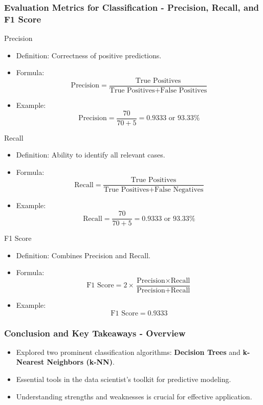\documentclass[aspectratio=169]{beamer}
\begin{document}
\begin{frame}[fragile]
    \frametitle{Evaluation Metrics for Classification - Precision, Recall, and F1 Score}
    
    \begin{block}{Precision}
        \begin{itemize}
            \item Definition: Correctness of positive predictions.
            \item Formula:
            \[
            \text{Precision} = \frac{\text{True Positives}}{\text{True Positives} + \text{False Positives}}
            \]
            \item Example: 
            \[
            \text{Precision} = \frac{70}{70 + 5} = 0.9333 \text{ or } 93.33\%
            \]
        \end{itemize}
    \end{block}
    
    \begin{block}{Recall}
        \begin{itemize}
            \item Definition: Ability to identify all relevant cases.
            \item Formula:
            \[
            \text{Recall} = \frac{\text{True Positives}}{\text{True Positives} + \text{False Negatives}}
            \]
            \item Example:
            \[
            \text{Recall} = \frac{70}{70 + 5} = 0.9333 \text{ or } 93.33\%
            \]
        \end{itemize}
    \end{block}
    
    \begin{block}{F1 Score}
        \begin{itemize}
            \item Definition: Combines Precision and Recall.
            \item Formula:
            \[
            \text{F1 Score} = 2 \times \frac{\text{Precision} \times \text{Recall}}{\text{Precision} + \text{Recall}}
            \]
            \item Example:
            \[
            \text{F1 Score} = 0.9333
            \]
        \end{itemize}
    \end{block}
\end{frame}

\begin{frame}[fragile]
    \frametitle{Conclusion and Key Takeaways - Overview}
    \begin{itemize}
        \item Explored two prominent classification algorithms: 
        \textbf{Decision Trees} and \textbf{k-Nearest Neighbors (k-NN)}.
        \item Essential tools in the data scientist's toolkit for predictive modeling.
        \item Understanding strengths and weaknesses is crucial for effective application.
    \end{itemize}
\end{frame}
\end{document}
